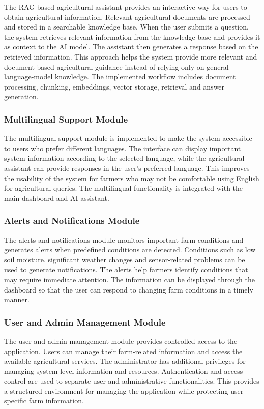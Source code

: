 The RAG-based agricultural assistant provides an interactive way for users to obtain agricultural information. Relevant agricultural documents are processed and stored in a searchable knowledge base. When the user submits a question, the system retrieves relevant information from the knowledge base and provides it as context to the AI model. The assistant then generates a response based on the retrieved information. This approach helps the system provide more relevant and document-based agricultural guidance instead of relying only on general language-model knowledge. The implemented workflow includes document processing, chunking, embeddings, vector storage, retrieval and answer generation.

\subsubsection{Multilingual Support Module}

The multilingual support module is implemented to make the system accessible to users who prefer different languages. The interface can display important system information according to the selected language, while the agricultural assistant can provide responses in the user's preferred language. This improves the usability of the system for farmers who may not be comfortable using English for agricultural queries. The multilingual functionality is integrated with the main dashboard and AI assistant.

\subsubsection{Alerts and Notifications Module}

The alerts and notifications module monitors important farm conditions and generates alerts when predefined conditions are detected. Conditions such as low soil moisture, significant weather changes and sensor-related problems can be used to generate notifications. The alerts help farmers identify conditions that may require immediate attention. The information can be displayed through the dashboard so that the user can respond to changing farm conditions in a timely manner.

\subsubsection{User and Admin Management Module}

The user and admin management module provides controlled access to the application. Users can manage their farm-related information and access the available agricultural services. The administrator has additional privileges for managing system-level information and resources. Authentication and access control are used to separate user and administrative functionalities. This provides a structured environment for managing the application while protecting user-specific farm information.

